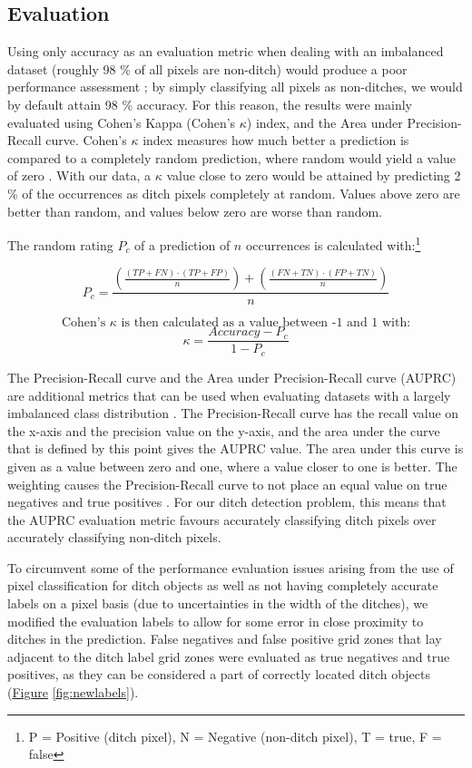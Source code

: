 \documentclass[]{interact}
\theoremstyle{plain}%
\theoremstyle{definition}
\theoremstyle{remark}
\begin{document}
\subsection{Evaluation} \label{evaluation}

Using only accuracy as an evaluation metric when dealing with an imbalanced dataset (roughly 98 \% of all pixels are non-ditch) would produce a poor performance assessment \citep{balanced}; by simply classifying all pixels as non-ditches, we would by default attain 98 \% accuracy. For this reason, the results were mainly evaluated using Cohen's Kappa (Cohen's $\kappa$) index, and the Area under Precision-Recall curve. Cohen's $\kappa$ index measures how much better a prediction is compared to a completely random prediction, where random would yield a value of zero \citep{kappa123}. With our data, a $\kappa$ value close to zero would be attained by predicting 2 \% of the occurrences as ditch pixels completely at random. Values above zero are better than random, and values below zero are worse than random.

The random rating $P_c$ of a prediction of $n$ occurrences is calculated with:\footnote{ P = Positive (ditch pixel), N = Negative (non-ditch pixel), T = true, F = false}

$$
P_c = \frac{\left(\frac{(TP + FN) \cdot (TP + FP)}{n}\right) + \left(\frac{(FN + TN) \cdot (FP + TN)}{n}\right)}{n}
$$

$$
\text{Cohen's } \kappa \text{ is then calculated as a value between -1 and 1 with:}
$$
$$\kappa = \frac{Accuracy - P_c}{1 - P_c}$$

The Precision-Recall curve and the Area under Precision-Recall curve (AUPRC) are additional metrics that can be used when evaluating datasets with a largely imbalanced class distribution \citep{precision_recall_curve}. The Precision-Recall curve has the recall value on the x-axis and the precision value on the y-axis, and the area under the curve that is defined by this point gives the AUPRC value. The area under this curve is given as a value between zero and one, where a value closer to one is better. The weighting causes the Precision-Recall curve to not place an equal value on true negatives and true positives \citep{precision_recall_curve}. For our ditch detection problem, this means that the AUPRC evaluation metric favours accurately classifying ditch pixels over accurately classifying non-ditch pixels.

To circumvent some of the performance evaluation issues arising from the use of pixel classification for ditch objects as well as not having completely accurate labels on a pixel basis (due to uncertainties in the width of the ditches), we modified the evaluation labels to allow for some error in close proximity to ditches in the prediction. False negatives and false positive grid zones that lay adjacent to the ditch label grid zones were evaluated as true negatives and true positives, as they can be considered a part of correctly located ditch objects (\hyperref[fig:newlabels]{Figure} \ref{fig:newlabels}).
\end{document}
